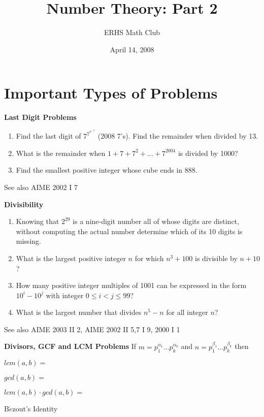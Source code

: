 \documentclass{article}
\title{Number Theory: Part 2}
\author{ERHS Math Club}
\date{April 14, 2008}
\begin{document}
\maketitle{}

\section{Important Types of Problems}

\textbf{Last Digit Problems}
\begin{enumerate}
\item Find the last digit of $7^{7^{7^{\ldots 7}}}$ (2008 7's). Find the remainder when divided by 13.
\item What is the remainder when $1+7+7^2+\ldots+7^{2004}$ is divided by 1000?
\item Find the smallest positive integer whose cube ends in 888.
\end{enumerate}
See also AIME 2002 I 7
\newline

\textbf{Divisibility}
\begin{enumerate}
\item Knowing that $2^{29}$ is a nine-digit number all of whose digits are distinct, without computing the actual number determine which of its 10 digits is missing.
\item What is the largest positive integer $n$ for which $n^3+100$ is divisible by $n+10$?
\item How many positive integer multiples of 1001 can be expressed in the form $10^i-10^j$ with integer $0 \leq i < j \leq 99$?
\item What is the largest number that divides $n^5-n$ for all integer $n$?
\end{enumerate}
See also AIME 2003 II 2, AIME 2002 II 5,7 I 9, 2000 I 1
\newline

\textbf{Divisors, GCF and LCM Problems}
If $m=p_{1}^{\alpha_{1}}\ldots p_{k}^{\alpha_{k}}$ and $n=p_{1}^{\beta_{1}}\ldots p_{k}^{\beta_{k}}$ then

$lcm (a,b)=$

$gcd (a,b)=$

$lcm (a,b) \cdot gcd (a,b) =$

B$\acute{e}$zout's Identity
\end{document}
